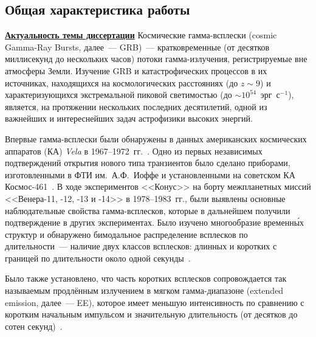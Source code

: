 \subsection*{\Large Общая характеристика работы}
\fontsize{14pt}{15pt}\selectfont
\underline{\textbf{Актуальность темы диссертации}}
Космические гамма-всплески (cosmic Gamma-Ray Bursts, далее~--- GRB)~--- кратковременные 
(от десятков миллисекунд до нескольких часов) потоки гамма-излучения, регистрируемые вне атмосферы Земли. 
Изучение GRB и катастрофических процессов в их  источниках, находящихся на 
космологических расстояниях (до $z\sim9$) и характеризующихся экстремальной пиковой 
светимостью (до $\sim 10^{54}$~эрг~с$^{-1}$), является, на протяжении нескольких 
последних десятилетий, одной из важнейших и интереснейших задач астрофизики высоких энергий.

Впервые гамма-всплески были обнаружены в данных американских космических 
аппаратов (КА) \textit{Vela} в 1967--1972~гг.~\citep{Klebesadel_1973ApJ}. 
Одно из первых независимых подтверждений открытия нового типа транзиентов 
было сделано приборами, изготовленными в ФТИ им.~А.Ф.~Иоффе и установленными 
на советском КА Космос-461~\citep{Mazets_1974PZETF_ru}. В ходе экспериментов <<Конус>> 
на борту межпланетных миссий <<Венера-11, -12, -13 и -14>> в 1978--1983~гг., были выявлены
основные наблюдательные свойства гамма-всплесков, которые в дальнейшем получили 
подтверждение в других экспериментах. Было изучено многообразие временн\'{ы}х структур
и обнаружено бимодальное распределение всплесков по длительности~--- 
наличие двух классов всплесков: длинных и коротких с границей по длительности 
около одной секунды~\citep{Mazets_1981_part_1}.

Было также установлено, что часть коротких всплесков
сопровождается так называемым продлённым излучением в мягком гамма-диапазоне 
(extended emission, далее~--- EE), которое имеет меньшую интенсивность 
по сравнению с коротким начальным импульсом и значительную длительность 
(от десятков до сотен секунд)~\citep[см., к примеру,][]{Burenin_2000AstL,Mazets_2002astro_ph,Frederiks_2004ASPC,Norris_and_Bonnel_2006ApJ}.


